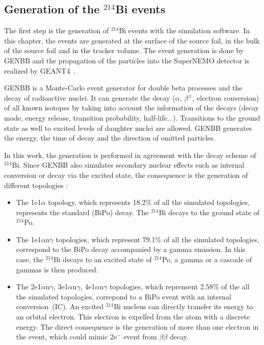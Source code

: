 \documentclass[main.tex]{subfiles}
\begin{document}
\subsection{Generation of the $^{\text{214}}$Bi events}\label{sec:GenerationBi214}


\noindent The first step is the generation of $^{\text{214}}$Bi events with the simulation software. In this chapter, the events are generated at the surface of the source foil, in the bulk of the source foil and in the tracker volume. The event generation is done by GENBB and the propagation of the particles into the SuperNEMO detector is realized by GEANT4~\cite{GEANT4}.


\bigskip


\noindent GENBB is a Monte-Carlo event generator for double beta processes and the decay of radioactive nuclei. It can generate the decay ($\alpha$, $\beta^\pm$, electron conversion) of all known isotopes by taking into account the information of the decays (decay mode, energy release, transition probability, half-life...). Transitions to the ground state as well to excited levels of daughter nuclei are allowed. GENBB generates the energy, the time of decay and the direction of emitted particles.


\bigskip 


\noindent In this work, the generation is performed in agreement with the decay scheme of $^{\text{214}}$Bi. Since GENBB also simulates secondary nuclear effects such as internal conversion or decay via the excited state, the consequence is the generation of different topologies :


\begin{itemize}
\item The 1e1$\alpha$ topology, which represents 18.2$\%$ of all the simulated topologies, represents the standard (BiPo) decay. The $^{\text{214}}$Bi decays to the ground state of $^{\text{214}}$Po.


\item The 1e1$\alpha$n$\gamma$ topologies, which represent 79.1$\%$ of all the simulated topologies, correspond to the BiPo decay accompanied by a gamma emission. In this case, the $^{\text{214}}$Bi decays to an excited state of $^{\text{214}}$Po, a gamma or a cascade of gammas is then produced.


\item The 2e1$\alpha$n$\gamma$, 3e1$\alpha$n$\gamma$, 4e1$\alpha$n$\gamma$ topologies, which reprensent 2.58$\%$ of the all the simulated topologies, correpond to a BiPo event with an internal conversion~(IC). An excited $^{\text{214}}$Bi nucleus can directly transfer its energy to an orbital electron. This electron is expelled from the atom with a discrete energy. The direct consequence is the generation of more than one electron in the event, which could mimic 2e$^-$ event from $\beta\beta$ decay.


\end{itemize}
\end{document}
